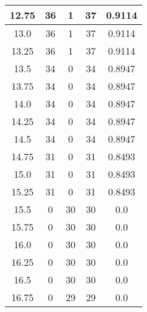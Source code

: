 \documentclass[letterpaper, 12pt]{article}
\begin{document}
\begin{longtable}{|c|c|c|c|c|}
\hline
12.75 & 36 & 1 & 37 & 0.9114 \\
\hline
13.0 & 36 & 1 & 37 & 0.9114 \\
\hline
13.25 & 36 & 1 & 37 & 0.9114 \\
\hline
13.5 & 34 & 0 & 34 & 0.8947 \\
\hline
13.75 & 34 & 0 & 34 & 0.8947 \\
\hline
14.0 & 34 & 0 & 34 & 0.8947 \\
\hline
14.25 & 34 & 0 & 34 & 0.8947 \\
\hline
14.5 & 34 & 0 & 34 & 0.8947 \\
\hline
14.75 & 31 & 0 & 31 & 0.8493 \\
\hline
15.0 & 31 & 0 & 31 & 0.8493 \\
\hline
15.25 & 31 & 0 & 31 & 0.8493 \\
\hline
15.5 & 0 & 30 & 30 & 0.0 \\
\hline
15.75 & 0 & 30 & 30 & 0.0 \\
\hline
16.0 & 0 & 30 & 30 & 0.0 \\
\hline
16.25 & 0 & 30 & 30 & 0.0 \\
\hline
16.5 & 0 & 30 & 30 & 0.0 \\
\hline
16.75 & 0 & 29 & 29 & 0.0 \\
\hline
\end{longtable}
\end{document}
